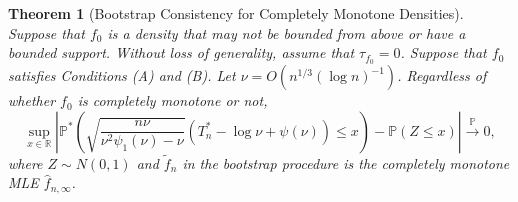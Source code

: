 \documentclass[12pt,letterpaper, twoside, openany]{article}
\theoremstyle{plain}
\newtheorem{theorem}{Theorem}[section]
\begin{document}
\begin{theorem}[Bootstrap Consistency for Completely Monotone Densities]\label{thm:bootstrap_consistency_CM}
Suppose that $f_0$ is a density that may not be bounded from above or have a bounded support. Without loss of generality, assume that $\tau_{f_0} = 0$. Suppose that $f_0$ satisfies Conditions (A) and (B). Let $\nu = O(n^{1/3}(\log n)^{-1})$.
Regardless of whether $f_0$ is completely monotone or not, 
\begin{equation*}
	\sup_{x \in \mathbb{R}} \left| \mathbb{P}^* \left( \sqrt{ \frac{n\nu}{\nu^2\psi_1(\nu)-\nu}} \left( T_n^* -  \log \nu +  \psi(\nu) \right)  \leq x\right) - \mathbb{P}(Z \leq x ) \right| \stackrel{\mathbb{P}}{\rightarrow} 0,
\end{equation*}
where $Z \sim N(0, 1)$  and $\tilde{f}_n$ in the bootstrap procedure is the completely monotone MLE $\hat{f}_{n,\infty}$.
\end{theorem}
\end{document}
